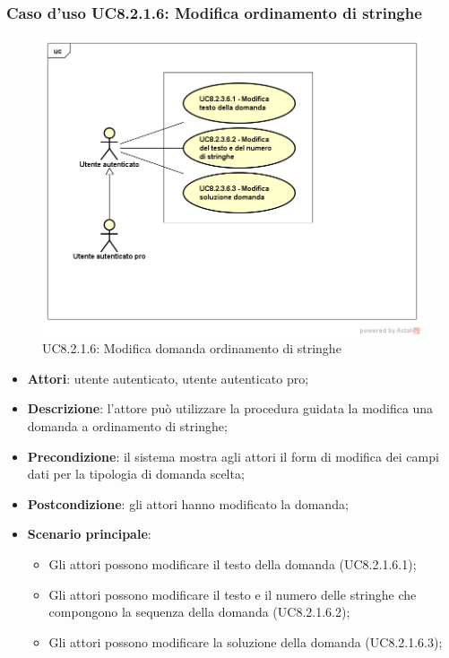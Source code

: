 \subsubsection{Caso d’uso UC8.2.1.6: Modifica ordinamento di stringhe}
	\label{UC8.2.1.6}
	\begin{figure}[h]
		\centering
		\includegraphics[scale=0.45,keepaspectratio]{UML/UC8_2_3_6.png}
		\caption{UC8.2.1.6: Modifica domanda ordinamento di stringhe}
	\end{figure}
	\FloatBarrier
\begin{itemize}
	\item\textbf{Attori}: utente autenticato, utente autenticato pro;
	\item\textbf{Descrizione}: l'attore può utilizzare la procedura guidata la modifica una domanda a ordinamento di stringhe;
	\item\textbf{Precondizione}: il sistema mostra agli attori il form di modifica dei campi dati per la tipologia di domanda scelta; 
	\item \textbf{Postcondizione}: gli attori hanno modificato la domanda;
	\item\textbf{Scenario principale}:
		\begin{itemize}
			\item Gli attori possono modificare il testo della domanda (UC8.2.1.6.1);
			\item Gli attori possono modificare il testo e il numero delle stringhe che compongono la sequenza della domanda (UC8.2.1.6.2);
			\item Gli attori possono modificare la soluzione della domanda (UC8.2.1.6.3); 
		\end{itemize}
\end{itemize}

